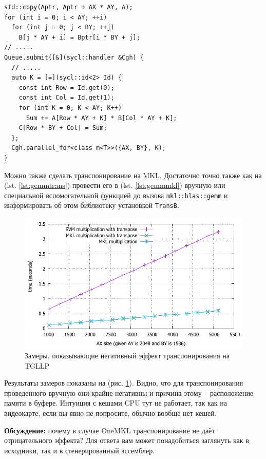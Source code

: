 \documentclass[a4paper,12pt,oneside]{article}
\begin{document}
\begin{lstlisting}[caption={Перемножение матриц с предварительным транспонированием},label={lst:gemmtrans}]
std::copy(Aptr, Aptr + AX * AY, A);
for (int i = 0; i < AY; ++i)
  for (int j = 0; j < BY; ++j)
    B[j * AY + i] = Bptr[i * BY + j];
// .....
Queue.submit([&](sycl::handler &Cgh) {
  // .....
  auto K = [=](sycl::id<2> Id) {
    const int Row = Id.get(0);
    const int Col = Id.get(1);
    for (int K = 0; K < AY; K++)
      Sum += A[Row * AY + K] * B[Col * AY + K];
    C[Row * BY + Col] = Sum;
  };
  Cgh.parallel_for<class m<T>>({AX, BY}, K);
}
\end{lstlisting}

Можно также сделать транспонирование на MKL.
Достаточно точно также как на (lst. \ref{lst:gemmtrans}) провести его в (lst. \ref{lst:gemmmkl}) вручную или специальной вспомогательной функцией до вызова \lstinline!mkl::blas::gemm! и информировать об этом библиотеку установкой \lstinline!TransB!.

\begin{figure}
\centering
\includegraphics[width=1.0\textwidth]{pictures/sgemm_trans.pdf}
\caption{Замеры, показывающие негативный эффект транспонирования на TGLLP}
\label{fig:sgemm_trans}
\end{figure}

Результаты замеров показаны на (рис. \ref{fig:sgemm_trans}). Видно, что для транспонирования проведенного вручную они крайне негативны и причина этому -- расположение памяти в буфере. Интуиция с кешами CPU тут не работает, так как на видеокарте, если вы явно не попросите, обычно вообще нет кешей.

\textbf{Обсуждение:} почему в случае OneMKL транспонирование не даёт отрицательного эффекта? Для ответа вам может понадобиться заглянуть как в исходники, так и в сгенерированный ассемблер.
\end{document}
